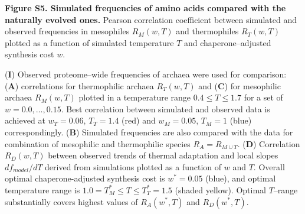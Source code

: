 \documentclass{report}
\begin{document}


{\bf Figure S5. Simulated frequencies of amino acids compared with the naturally evolved ones.} 
Pearson correlation coefficient between simulated and observed frequencies in mesophiles $R_M(w,T)$ and thermophiles $R_T(w,T)$ plotted as a function of simulated temperature $T$ and chaperone--adjusted synthesis cost $w$.

({\bf I}) Observed proteome--wide frequencies of archaea were used for comparison: ({\bf A}) correlations for thermophilic archaea $R_T(w,T)$ and ({\bf C}) for mesophilic archaea $R_M(w,T)$ plotted in a temperature range $0.4\leq T\leq1.7$ for a set of $w=0.0,\dots,0.15$. Best correlation between simulated and observed data is achieved at $w_T=0.06$, $T_T=1.4$ (red) and $w_M=0.05$, $T_M=1$ (blue) correspondingly. ({\bf B}) Simulated frequencies are also compared with the data for combination of mesophilic and thermophilic species $R_A = R_{M\cup T}$. ({\bf D}) Correlation $R_D(w,T)$ between observed trends of thermal adaptation and local slopes $df_{model}/dT$ derived from simulations plotted as a function of $w$ and $T$. Overall optimal chaperone-adjusted synthesis cost is $w^*=0.05$ (blue), and optimal temperature range is $1.0=T^*_M\leq T\leq T^*_T=1.5$ (shaded yellow). Optimal $T$--range substantially covers highest values of $R_A(w^*,T)$ and $R_D(w^*,T)$.
\end{document}
